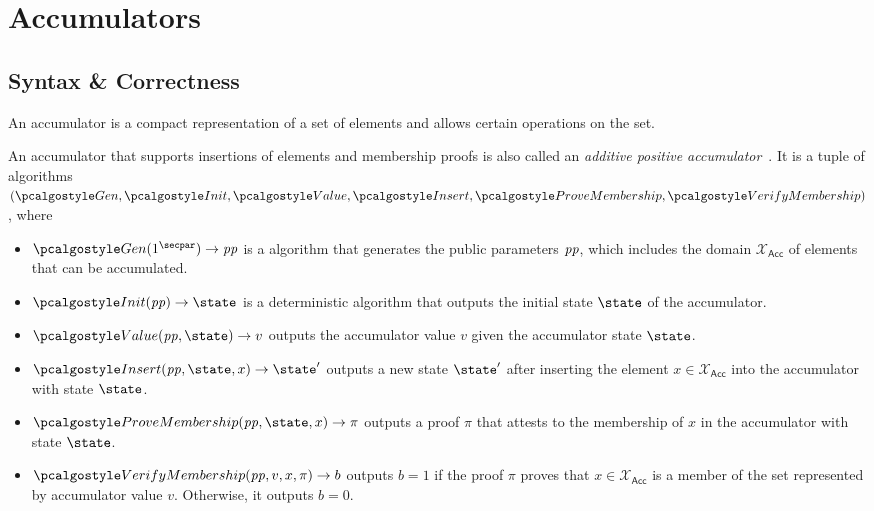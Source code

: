 \section{Accumulators}\label{sec:accumulators}

\subsection{Syntax \& Correctness}

An accumulator is a compact representation of a set of elements and allows certain operations on the set.

\begin{definition}[Accumulator]\label{def:accumulator}
An accumulator that supports insertions of elements and membership proofs is also called an \emph{additive positive accumulator}~\cite{RSA:BalCanYak20}.
It is a tuple of \ppt algorithms $(\algo{Gen}, \algo{Init}, \algo{Value}, \algo{Insert}, \algo{ProveMembership}, \algo{VerifyMembership})$, where

\begin{itemize}
    \item $\algo{Gen}(1^\secpar)\rightarrow \params$ is a \ppt algorithm that generates the public parameters $\mathit{pp}$, which includes the domain $\mathcal{X}_\mathsf{Acc}$ of elements that can be accumulated.
    \item $\algo{Init}(\params)\rightarrow \state$ is a deterministic algorithm that outputs the initial state $\state$ of the accumulator.
    \item $\algo{Value}(\params, \state)\rightarrow v$ outputs the accumulator value $v$ given the accumulator state $\state$.
    \item $\algo{Insert}(\params, \state, x) \rightarrow \state'$ outputs a new state $\state'$ after inserting the element $x \in \mathcal{X}_\mathsf{Acc}$ into the accumulator with state $\state$.
    \item $\algo{ProveMembership}(\params, \state, x) \rightarrow \pi$ outputs a proof $\pi$ that attests to the membership of $x$ in the accumulator with state $\state$.
    \item $\algo{VerifyMembership}(\params, v, x, \pi) \rightarrow b$ outputs $b = 1$ if the proof $\pi$ proves that $x \in \mathcal{X}_\mathsf{Acc}$ is a member of the set represented by accumulator value $v$. Otherwise, it outputs $b = 0$.
\end{itemize}
\end{definition}

